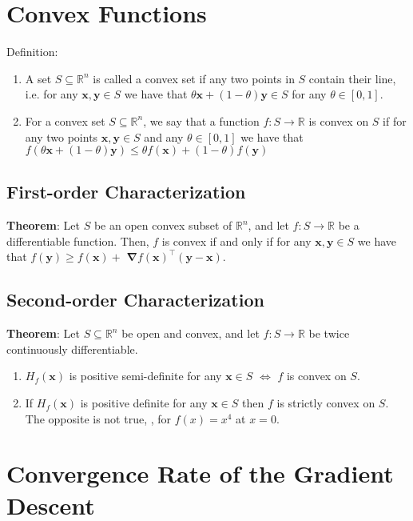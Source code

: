 \section{Convex Functions}

Definition:
\begin{enumerate}
    \item  A set $S \subseteq \mathbb{R}^{n}$ is called a convex set if any two points in $S$ contain their line, i.e. for any $\boldsymbol{x}, \boldsymbol{y} \in S$ we have that $\theta \boldsymbol{x}+(1-\theta) \boldsymbol{y} \in S$ for any $\theta \in[0,1]$.
    \item For a convex set $S \subseteq \mathbb{R}^{n}$, we say that a function $f: S \rightarrow \mathbb{R}$ is convex on $S$ if for any two points $\boldsymbol{x}, \boldsymbol{y} \in S$ and any $\theta \in[0,1]$ we have that
    $
    f(\theta \boldsymbol{x}+(1-\theta) \boldsymbol{y}) \leq \theta f(\boldsymbol{x})+(1-\theta) f(\boldsymbol{y})
    $
\end{enumerate}


\subsection{First-order Characterization}
\textbf{Theorem}:
Let $S$ be an open convex subset of $\mathbb{R}^{n}$, and let $f: S \rightarrow \mathbb{R}$ be a differentiable function. Then, $f$ is convex if and only if for any $\boldsymbol{x}, \boldsymbol{y} \in S$ we have that $f(\boldsymbol{y}) \geq f(\boldsymbol{x})+$ $\boldsymbol{\nabla} f(\boldsymbol{x})^{\top}(\boldsymbol{y}-\boldsymbol{x}) .$

\subsection{Second-order Characterization}
\textbf{Theorem}:
Let $S \subseteq \mathbb{R}^{n}$ be open and convex, and let $f: S \rightarrow \mathbb{R}$ be twice continuously differentiable.
\begin{enumerate}
    \item $H_{f}(\boldsymbol{x})$ is positive semi-definite for any $\boldsymbol{x} \in S$ $\Leftrightarrow$ $f$ is convex on $S$.
    \item If $H_{f}(\boldsymbol{x})$ is positive definite for any $\boldsymbol{x} \in S$ then $f$ is strictly convex on $S$. The opposite is not true, \eg, for $f(x)=x^4$ at $x=0$.
\end{enumerate}

\section{Convergence Rate of the Gradient Descent}

